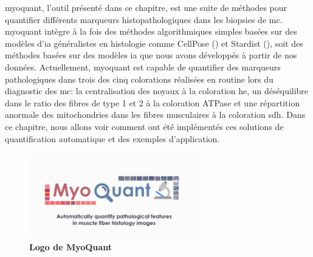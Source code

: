 \gls{myoquant}, l'outil présenté dans ce chapitre, est une suite de méthodes pour quantifier différents marqueurs histopathologiques dans les biopsies de \gls{mc}. \gls{myoquant} intègre à la fois des méthodes algorithmiques simples basées sur des modèles d'\gls{ia} généralistes en histologie comme CellPose (\cite{stringer_cellpose_2021}) et Stardist (\cite{weigert_star-convex_2020}), soit des méthodes basées sur des modèles \gls{ia} que nous avons développés à partir de nos données. Actuellement, \gls{myoquant} est capable de quantifier des marqueurs pathologiques dans trois des cinq colorations réalisées en routine lors du diagnostic des \gls{mc}: la centralisation des noyaux à la coloration \gls{he}, un déséquilibre dans le ratio des fibres de type 1 et 2 à la coloration ATPase et une répartition anormale des mitochondries dans les fibres musculaires à la coloration \gls{sdh}. Dans ce chapitre, nous allons voir comment ont été implémentés ces solutions de quantification automatique et des exemples d'application.

\begin{figure}[!ht]
 \centering
 \includegraphics[width=0.66\textwidth]{figures/myoquant_logo.png}
 \caption[Logo MyoQuant]{\textbf{Logo de MyoQuant}}
 \label{fig:myoquant_logo}
\end{figure}

